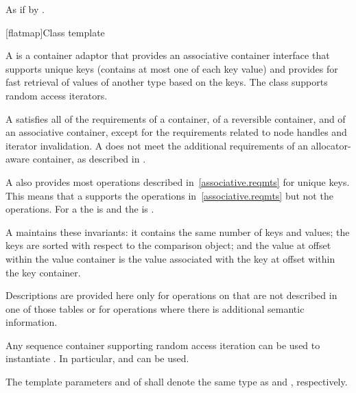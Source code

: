 \begin{codeblock}
\begin{codeblock}
\begin{codeblock}
\begin{itemdescr}
\pnum
\effects As if by .
\end{itemdescr}

\begin{addedblock}
[flatmap]{Class template }

\pnum
{}%
A  is a container adaptor that provides an associative
container interface that supports unique keys (contains at most one of each
key value) and provides for fast retrieval of values of another type 
based on the keys. The  class supports random access
iterators.

\pnum
A  satisfies all of the requirements of a container, of a
reversible container, and of an associative
container, except for the requirements related to
node handles and iterator
invalidation.  A  does not
meet the additional requirements of an allocator-aware container, as described
in .

\pnum
A  also provides most operations described
in~\ref{associative.reqmts} for unique keys.  This means that a
 supports the  operations
in~\ref{associative.reqmts} but not the  operations.  For
a  the  is  and the
 is .

\pnum
A   maintains these invariants: it contains the same
number of keys and values; the keys are sorted with respect to the
comparison object; and the value at offset  within the value
container is the value associated with the key at offset  within the
key container.

\pnum
Descriptions are provided here only for operations on  that
are not described in one of those tables or for operations where there is
additional semantic information.

\pnum
Any sequence container supporting random access iteration can be used to
instantiate . In particular,  and
 can be used.

\pnum
The template parameters  and  of  shall
denote the same type as 
and , respectively.


\end{addedblock}
\end{codeblock}
\end{codeblock}
\end{codeblock}
